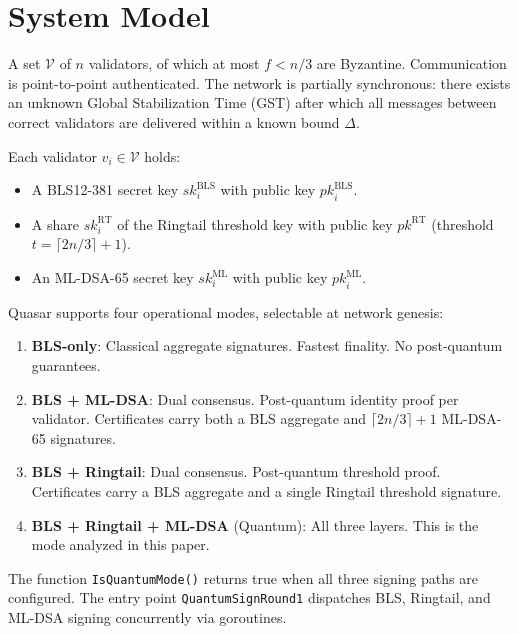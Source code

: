 \section{System Model}

\label{sec:model}

\begin{definition}[Network]
A set $\mathcal{V}$ of $n$ validators, of which at most $f < n/3$ are
Byzantine. Communication is point-to-point authenticated. The network is
partially synchronous: there exists an unknown Global Stabilization Time
(GST) after which all messages between correct validators are delivered within
a known bound $\Delta$.
\end{definition}

\begin{definition}
Each validator $v_i \in \mathcal{V}$ holds:
\begin{itemize}[leftmargin=2em]
\item A BLS12-381 secret key $\mathit{sk}_i^{\mathrm{BLS}}$ with public key
      $\mathit{pk}_i^{\mathrm{BLS}}$.
\item A share $\mathit{sk}_i^{\mathrm{RT}}$ of the Ringtail threshold key
      with public key $\mathit{pk}^{\mathrm{RT}}$ (threshold $t = \lceil 2n/3
      \rceil + 1$).
\item An ML-DSA-65 secret key $\mathit{sk}_i^{\mathrm{ML}}$ with public key
      $\mathit{pk}_i^{\mathrm{ML}}$.
\end{itemize}
\end{definition}

\begin{definition}
\label{def:modes}
Quasar supports four operational modes, selectable at network genesis:
\begin{enumerate}[leftmargin=2em]
\item \textbf{BLS-only}: Classical aggregate signatures. Fastest finality.
      No post-quantum guarantees.
\item \textbf{BLS + ML-DSA}: Dual consensus. Post-quantum identity proof per
      validator. Certificates carry both a BLS aggregate and $\lceil 2n/3
      \rceil + 1$ ML-DSA-65 signatures.
\item \textbf{BLS + Ringtail}: Dual consensus. Post-quantum threshold proof.
      Certificates carry a BLS aggregate and a single Ringtail threshold
      signature.
\item \textbf{BLS + Ringtail + ML-DSA} (Quantum): All three layers. This is
      the mode analyzed in this paper.
\end{enumerate}
\end{definition}

The function \texttt{IsQuantumMode()} returns true when all three signing paths
are configured. The entry point \texttt{QuantumSignRound1} dispatches BLS,
Ringtail, and ML-DSA signing concurrently via goroutines.


